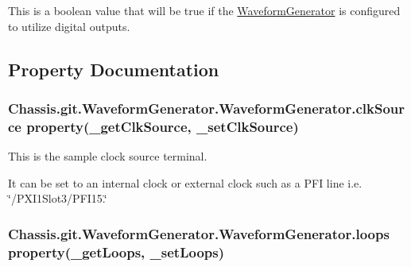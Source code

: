 This is a boolean value that will be true if the \hyperlink{class_chassis_8git_1_1_waveform_generator_1_1_waveform_generator}{Waveform\-Generator} is configured to utilize digital outputs. 



\subsection{Property Documentation}
\hypertarget{class_chassis_8git_1_1_waveform_generator_1_1_waveform_generator_a078c66a16dae8dc6bbf6c2ae55ff7c75}{
\subsubsection[{clk\-Source}]{\setlength{\rightskip}{0pt plus 5cm}Chassis.\-git.\-Waveform\-Generator.\-Waveform\-Generator.\-clk\-Source property(\-\_\-get\-Clk\-Source, \-\_\-set\-Clk\-Source)\hspace{0.3cm}{\ttfamily [static]}}}\label{class_chassis_8git_1_1_waveform_generator_1_1_waveform_generator_a078c66a16dae8dc6bbf6c2ae55ff7c75}


This is the sample clock source terminal. 

It can be set to an internal clock or external clock such as a P\-F\-I line i.\-e. \char`\"{}/\-P\-X\-I1\-Slot3/\-P\-F\-I15.\char`\"{} \hypertarget{class_chassis_8git_1_1_waveform_generator_1_1_waveform_generator_a1b91e7f61684217ac0067de9631b4603}{
\subsubsection[{loops}]{\setlength{\rightskip}{0pt plus 5cm}Chassis.\-git.\-Waveform\-Generator.\-Waveform\-Generator.\-loops property(\-\_\-get\-Loops, \-\_\-set\-Loops)\hspace{0.3cm}{\ttfamily [static]}}}\label{class_chassis_8git_1_1_waveform_generator_1_1_waveform_generator_a1b91e7f61684217ac0067de9631b4603}


